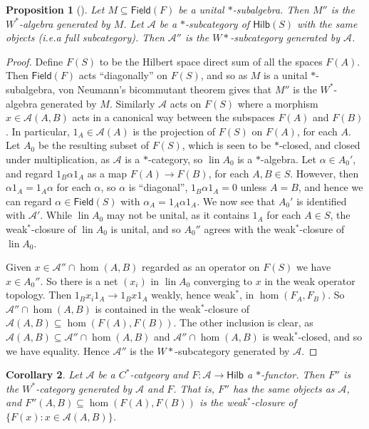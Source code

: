 \documentclass[a4paper,11pt]{article}
\theoremstyle{plain}
\newtheorem{proposition}{Proposition}[section]
\newtheorem{corollary}[proposition]{Corollary}
\theoremstyle{remark}
\newcommand{\mc}[1]{\mathcal{#1}}
\newcommand{\lin}{\operatorname{lin}}
\newcommand{\catHilb}{\textsf{Hilb}}
\newcommand{\field}{\textsf{Field}}
\newcommand{\catHilbField}[1]{\textsf{Hilb}(#1)}
\begin{document}
\begin{proposition}[{\cite[Theorem~4.2]{GLR_Wstar_categories}}]
Let $M \subseteq \field(F)$ be a unital $*$-subalgebra.  Then $M''$ is the $W^*$-algebra generated by $M$.  Let $\mc A$ be a $*$-subcategory of $\catHilbField{S}$ with the same objects (i.e.\@ a full subcategory).  Then $\mc A''$ is the $W*$-subcategory generated by $\mc A$.
\end{proposition}
\begin{proof}
Define $F(S)$ to be the Hilbert space direct sum of all the spaces $F(A)$.  Then $\field(F)$ acts ``diagonally'' on $F(S)$, and so as $M$ is a unital $*$-subalgebra, von Neumann's bicommutant theorem gives that $M''$ is the $W^*$-algebra generated by $M$.  Similarly $\mc A$ acts on $F(S)$ where a morphism $x\in\mc A(A,B)$ acts in a canonical way between the subspaces $F(A)$ and $F(B)$.  In particular, $1_A \in \mc A(A)$ is the projection of $F(S)$ on $F(A)$, for each $A$.    Let $A_0$ be the resulting subset of $F(S)$, which is seen to be $*$-closed, and closed under multiplication, as $\mc A$ is a $*$-category, so $\lin A_0$ is a $*$-algebra.  Let $\alpha\in A_0'$, and regard $1_B \alpha 1_A$ as a map $F(A) \to F(B)$, for each $A,B\in S$.  However, then $\alpha 1_A = 1_A \alpha$ for each $\alpha$, so $\alpha$ is ``diagonal'', $1_B \alpha 1_A = 0$ unless $A=B$, and hence we can regard $\alpha \in \field(S)$ with $\alpha_A = 1_A \alpha 1_A$.  We now see that $A_0'$ is identified with $\mc A'$.  While $\lin A_0$ may not be unital, as it contains $1_A$ for each $A\in S$, the weak$^*$-closure of $\lin A_0$ is unital, and so $A_0''$ agrees with the weak$^*$-closure of $\lin A_0$.

Given $x\in \mc A'' \cap \hom(A,B)$ regarded as an operator on $F(S)$ we have $x\in A_0''$.  So there is a net $(x_i)$ in $\lin A_0$ converging to $x$ in the weak operator topology.  Then $1_B x_i 1_A \to 1_B x 1_A$ weakly, hence weak$^*$, in $\hom(F_A, F_B)$.  So $\mc A'' \cap \hom(A,B)$ is contained in the weak$^*$-closure of $\mc A(A,B) \subseteq \hom(F(A), F(B))$.  The other inclusion is clear, as $\mc A(A,B) \subseteq \mc A'' \cap \hom(A,B)$ and $\mc A'' \cap \hom(A,B)$ is weak$^*$-closed, and so we have equality.  Hence $\mc A''$ is the $W*$-subcategory generated by $\mc A$.
\end{proof}

\begin{corollary}
Let $\mc A$ be a $C^*$-catgeory and $F \colon \mc A \to \catHilb$ a $*$-functor.  Then $F''$ is the $W^*$-category generated by $\mc A$ and $F$.  That is, $F''$ has the same objects as $\mc A$, and $F''(A,B) \subseteq \hom(F(A), F(B))$ is the weak$^*$-closure of $\{ F(x) : x\in \mc A(A,B) \}$.
\end{corollary}
\end{document}

